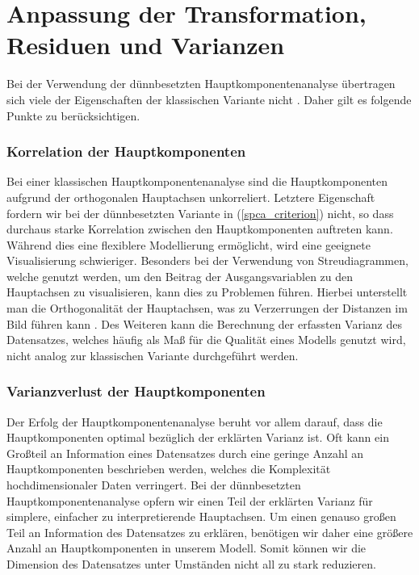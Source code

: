 \section{Anpassung der Transformation, Residuen und Varianzen}
\label{adjustment_of_variances}

Bei der Verwendung der dünnbesetzten Hauptkomponentenanalyse übertragen sich viele der Eigenschaften der klassischen Variante nicht \cite{camacho}. Daher gilt es folgende Punkte zu berücksichtigen.

\subsubsection{Korrelation der Hauptkomponenten}

Bei einer klassischen Hauptkomponentenanalyse sind die Hauptkomponenten aufgrund der orthogonalen Hauptachsen unkorreliert. Letztere Eigenschaft fordern wir bei der dünnbesetzten Variante in (\ref{spca_criterion}) nicht, so dass durchaus starke Korrelation zwischen den Hauptkomponenten auftreten kann. Während dies eine flexiblere Modellierung ermöglicht, wird eine geeignete Visualisierung schwieriger. Besonders bei der Verwendung von Streudiagrammen, welche genutzt werden, um den Beitrag der Ausgangsvariablen zu den Hauptachsen zu visualisieren, kann dies zu Problemen führen. Hierbei unterstellt man die Orthogonalität der Hauptachsen, was zu Verzerrungen der Distanzen im Bild führen kann \cite{geladi}. Des Weiteren kann die Berechnung der erfassten Varianz des Datensatzes, welches häufig als Maß für die Qualität eines Modells genutzt wird, nicht analog zur klassischen Variante durchgeführt werden.

\subsubsection{Varianzverlust der Hauptkomponenten}

Der Erfolg der Hauptkomponentenanalyse beruht vor allem darauf, dass die Hauptkomponenten optimal bezüglich der erklärten Varianz ist. Oft kann ein Großteil an Information eines Datensatzes durch eine geringe Anzahl an Hauptkomponenten beschrieben werden, welches die Komplexität hochdimensionaler Daten verringert. Bei der dünnbesetzten Hauptkomponentenanalyse opfern wir einen Teil der erklärten Varianz für simplere, einfacher zu interpretierende Hauptachsen. Um einen genauso großen Teil an Information des Datensatzes zu erklären, benötigen wir daher eine größere Anzahl an Hauptkomponenten in unserem Modell. Somit können wir die Dimension des Datensatzes unter Umständen nicht all zu stark reduzieren.

